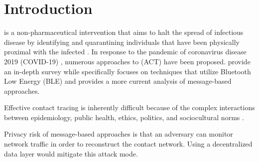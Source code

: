 \chapter{Introduction}

 is a non-pharmaceutical intervention that aims to halt the spread of infectious disease by identifying and quarantining individuals that have been physically proximal with the infected \citep{Brandt2022, PozoMartin2023}. In response to the pandemic of coronavirus disease 2019 (COVID-19) \citep{Zhu2020, Gorbalenya2020, Singh2021}, numerous approaches to  (ACT) have been proposed.\citet{Shubina2020} provide an in-depth survey while \citet{Reichert2021} specifically focuses on techniques that utilize Bluetooth Low Energy (BLE) and provides a more current analysis of message-based approaches.



Effective contact tracing is inherently difficult because of the complex interactions between epidemiology, public health, ethics, politics, and sociocultural norms \citep{Brandt2022}.


Privacy risk of message-based approaches is that an adversary can monitor network traffic in order to reconstruct the contact network. Using a decentralized data layer would mitigate this attack mode.


